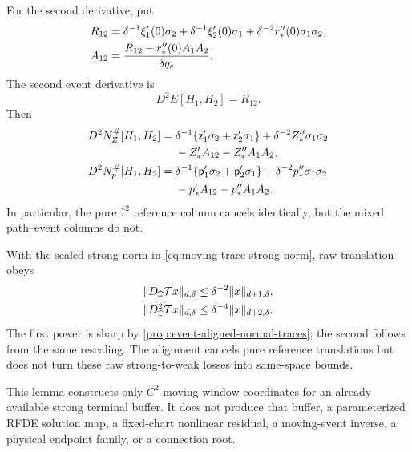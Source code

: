 \begin{lemma}
For the second derivative, put
\begin{align}
 R_{12}
 &=\delta^{-1}\xi_1'(0)\sigma_2
   +\delta^{-1}\xi_2'(0)\sigma_1
   +\delta^{-2}r_*''(0)\sigma_1\sigma_2,\notag\\
 A_{12}
 &=\frac{R_{12}-r_*''(0)A_1A_2}{\delta q_e}.
                                                        \label{eq:trace-scale-second-data}
\end{align}
The second event derivative is
\begin{equation}
 D^2E[H_1,H_2]=R_{12}.                              \label{eq:trace-scale-event-second}
\end{equation}
Then
\begin{align}
 D^2N_Z^\#[H_1,H_2]
={}&\delta^{-1}\{
   \mathsf z_1'\sigma_2+\mathsf z_2'\sigma_1\}
 +\delta^{-2}Z_*''\sigma_1\sigma_2\notag\\
 &{}-Z_*'A_{12}-Z_*''A_1A_2,                     \label{eq:trace-scale-Z-second}\\
 D^2N_p^\#[H_1,H_2]
={}&\delta^{-1}\{
   \mathsf p_1'\sigma_2+\mathsf p_2'\sigma_1\}
 +\delta^{-2}p_*''\sigma_1\sigma_2\notag\\
 &{}-p_*'A_{12}-p_*''A_1A_2.                     \label{eq:trace-scale-p-second}
\end{align}
In particular, the pure \(\widehat\tau^2\) reference column cancels
identically, but the mixed path--event columns do not.

With the scaled strong norm in
\cref{eq:moving-trace-strong-norm}, raw translation obeys
\begin{align}
 \|D_{\widehat\tau}\mathcal T x\|_{d,\delta}
 &\le\delta^{-2}\|x\|_{d+1,\delta},\notag\\
 \|D_{\widehat\tau}^2\mathcal T x\|_{d,\delta}
 &\le\delta^{-4}\|x\|_{d+2,\delta}.              \label{eq:trace-scale-translation-losses}
\end{align}
The first power is sharp by
\cref{prop:event-aligned-normal-traces}; the second follows from the same
rescaling.  The alignment cancels pure reference translations but does not
turn these raw strong-to-weak losses into same-space bounds.

This lemma constructs only \(C^2\) moving-window coordinates for an already
available strong terminal buffer.  It does not produce that buffer, a parameterized RFDE
solution map, a fixed-chart nonlinear residual, a moving-event inverse, a
physical endpoint family, or a connection root.
\end{lemma}

